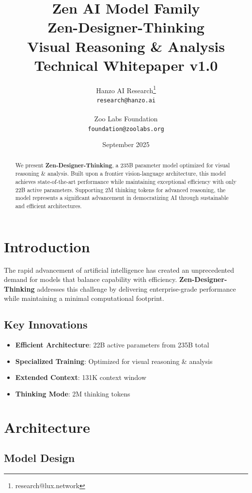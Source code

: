 \documentclass[11pt,a4paper]{article}
\title{
    \vspace{-2cm}
    \Large \textbf{Zen AI Model Family} \\
    \vspace{0.5cm}
    \Huge \textbf{Zen-Designer-Thinking} \\
    \vspace{0.3cm}
    \large Visual Reasoning \&   Analysis \\
    \vspace{0.5cm}
    \normalsize Technical Whitepaper v1.0
}
\author{
    Hanzo AI Research\thanks{research@lux.network} \\
    \texttt{research@hanzo.ai} \\
    \\
    Zoo Labs Foundation \\
    \texttt{foundation@zoolabs.org}
}
\date{September 2025}
\begin{document}
\maketitle

\begin{abstract}
We present \textbf{Zen-Designer-Thinking}, a 235B parameter model optimized for visual reasoning \&   analysis. 
Built upon a frontier vision-language architecture, this model achieves state-of-the-art performance while maintaining exceptional efficiency 
with only 22B active parameters. Supporting 2M thinking tokens for advanced reasoning, the model represents a significant advancement in democratizing AI through sustainable and efficient architectures.
\end{abstract}

\tableofcontents
\newpage

\section{Introduction}

The rapid advancement of artificial intelligence has created an unprecedented demand for models that balance capability with efficiency. 
\textbf{Zen-Designer-Thinking} addresses this challenge by delivering enterprise-grade performance while maintaining a minimal computational footprint.

\subsection{Key Innovations}
\begin{itemize}
    \item \textbf{Efficient Architecture}: 22B active parameters from 235B total
    \item \textbf{Specialized Training}: Optimized for visual reasoning \& analysis
    \item \textbf{Extended Context}: 131K context window
    \item \textbf{Thinking Mode}: 2M thinking tokens
    
    
\end{itemize}

\section{Architecture}

\subsection{Model Design}
\end{document}

